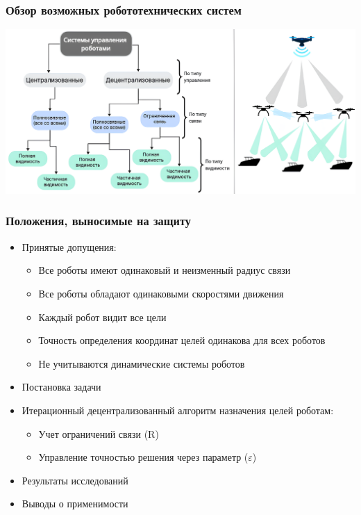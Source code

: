 \documentclass{beamer}
\begin{document}
\begin{frame}
\begin{columns}[T]
\begin{column}{0.6\textwidth}
	        \end{column}
	    \end{columns}
	\end{frame}

	\begin{frame}
		\frametitle{Обзор возможных робототехнических систем}
		\centering
		\includegraphics[width=\textwidth,height=0.95\textheight,keepaspectratio]{classification.png}
	\end{frame}


	\begin{frame}
		\frametitle{Положения, выносимые на защиту}
		\begin{itemize}
			\item Принятые допущения:
				\begin{itemize}
					\item Все роботы имеют одинаковый и неизменный радиус связи
					\item Все роботы обладают одинаковыми скоростями движения
					\item Каждый робот видит все цели
					\item Точность определения координат целей одинакова для всех роботов
					\item Не учитываются динамические системы роботов
				\end{itemize}
			\item Постановка задачи
			\item Итерационный децентрализованный алгоритм назначения целей роботам:
				\begin{itemize}
					\item Учет ограничений связи (R)
					\item Управление точностью решения через параметр (\(\varepsilon\))
				\end{itemize}
			\item Результаты исследований
			\item Выводы о применимости
		\end{itemize}
	\end{frame}
\end{document}
